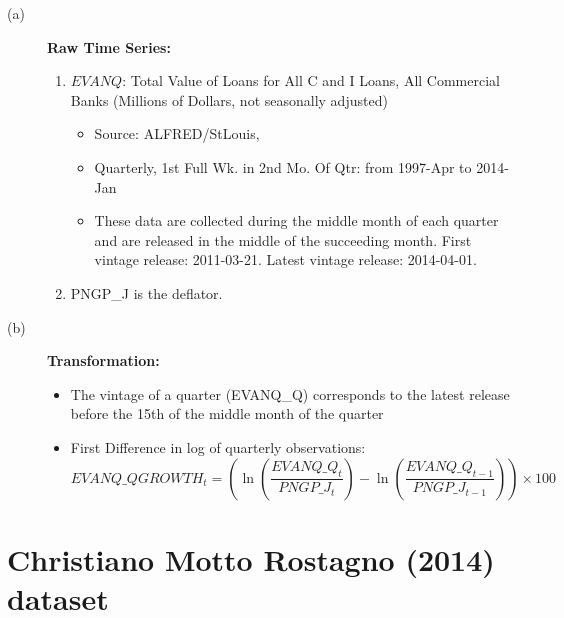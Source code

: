 \documentclass[3p,review,times]{elsarticle}		%
\begin{document}
\begin{description}
	\item[(a)] \textbf{Raw Time Series:}
	\begin{enumerate}
		\item $EVANQ$: Total Value of Loans for All C and I Loans, All Commercial Banks (Millions of Dollars, not seasonally adjusted)
		
		\begin{itemize}
			\item Source: ALFRED/StLouis,
			\item Quarterly, 1st Full Wk. in 2nd Mo. Of Qtr: from 1997-Apr to 2014-Jan
			\item These data are collected during the middle month of each quarter and are released in the middle of the succeeding month. First vintage release: 2011-03-21. Latest vintage release: 2014-04-01. 
			
		\end{itemize}
		\item PNGP\_J is the deflator.
	\end{enumerate}
	\item[(b)] \textbf{Transformation:}
	\begin{itemize}			
		\item The vintage of a quarter (EVANQ\_Q) corresponds to the latest release before the 15th of the middle month of the quarter
		\item First Difference in log of quarterly observations:
		$$EVANQ\_QGROWTH_{t}=\left(\ln\left(\frac{EVANQ\_Q_t}{PNGP\_J_t}\right)-\ln\left(\frac{EVANQ\_Q_{t-1}}{PNGP\_J_{t-1}}\right)\right)\times 100$$
	\end{itemize}
\end{description}


\section{Christiano Motto Rostagno (2014) dataset}
\end{document}
